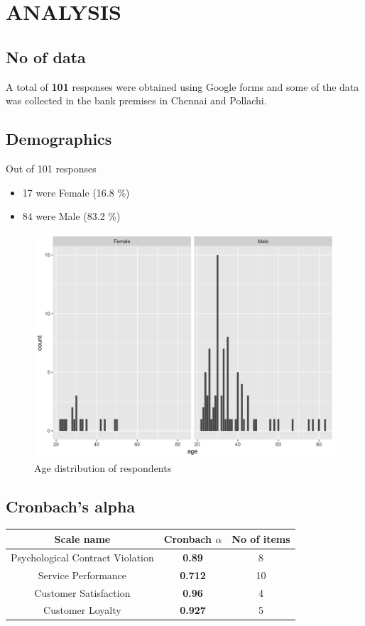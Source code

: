 \documentclass[a4paper, 14pt]{article}
\begin{document}
{\section*{ANALYSIS}
\subsection*{No of data}
 A total of \textbf{101} responses were obtained using Google forms and some of the data was collected in the bank premises in Chennai and Pollachi.
\subsection*{Demographics}
\par Out of 101 responses
\begin{itemize}
\item 17 were Female (16.8 \%)
\item 84 were Male (83.2 \%)
\end{itemize}
\begin{figure}[H]
\centering
\includegraphics[scale=0.2]{age_distribution.png}
\caption{Age distribution of respondents}
\end{figure}
\subsection*{Cronbach's alpha}
\begin{center}
\begin{tabular}{|c|c|c|}
\hline
\textbf{Scale name} & \textbf{Cronbach $\alpha$} & \textbf{No of items}\\
\hline
Psychological Contract Violation & \textbf{0.89} & 8\\
Service Performance & \textbf{0.712} & 10\\
Customer Satisfaction & \textbf{0.96} & 4\\
Customer Loyalty & \textbf{0.927} & 5 \\
\hline
\end{tabular}
\end{center}

}
\end{document}
